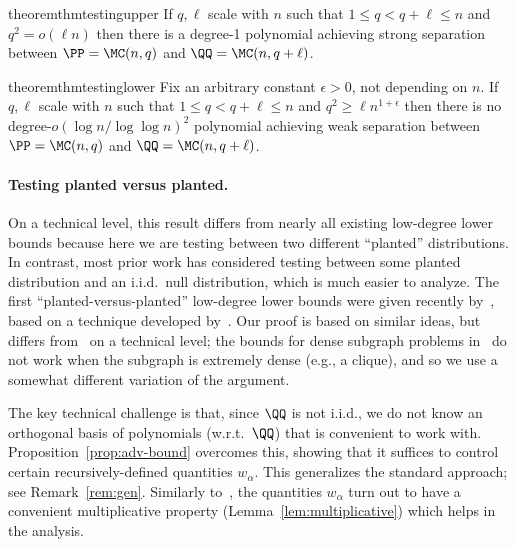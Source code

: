 \documentclass{article}
\begin{document}
\begin{restatable}{theorem}{thmtestingupper}
\label{thm:testing-upper}
If $q,\ell$ scale with $n$ such that $1 \le q < q+\ell \le n$ and $q^2 = o(\ell n)$ then there is a degree-1 polynomial achieving strong separation between $\PP = \MC(n,q)$ and $\QQ = \MC(n,q+\ell)$.
\end{restatable}

\vspace{-3pt}

\begin{restatable}{theorem}{thmtestinglower}\label{thm:testing-lower}
Fix an arbitrary constant $\epsilon > 0$, not depending on $n$. If $q,\ell$ scale with $n$ such that $1 \le q < q+\ell \le n$ and $q^2 \ge \ell n^{1+\epsilon}$ then there is no degree-$o(\log n/\log\log n)^2$ polynomial achieving weak separation between $\PP = \MC(n,q)$ and $\QQ = \MC(n,q+\ell)$.
\end{restatable}



\paragraph{Testing planted versus planted.}

On a technical level, this result differs from nearly all existing low-degree lower bounds because here we are testing between two different ``planted'' distributions. In contrast, most prior work has considered testing between some planted distribution and an i.i.d.\ null distribution, which is much easier to analyze. The first ``planted-versus-planted'' low-degree lower bounds were given recently by~\cite{planted-planted}, based on a technique developed by~\cite{SW-recovery}. Our proof is based on similar ideas, but differs from~\cite{planted-planted} on a technical level; the bounds for dense subgraph problems in~\cite{planted-planted} do not work when the subgraph is extremely dense (e.g., a clique), and so we use a somewhat different variation of the argument.

The key technical challenge is that, since $\QQ$ is not i.i.d., we do not know an orthogonal basis of polynomials (w.r.t.\ $\QQ$) that is convenient to work with. Proposition~\ref{prop:adv-bound} overcomes this, showing that it suffices to control certain recursively-defined quantities $w_\alpha$. This generalizes the standard approach; see Remark~\ref{rem:gen}. Similarly to~\cite{planted-planted}, the quantities $w_\alpha$ turn out to have a convenient multiplicative property (Lemma~\ref{lem:multiplicative}) which helps in the analysis.
\end{document}
